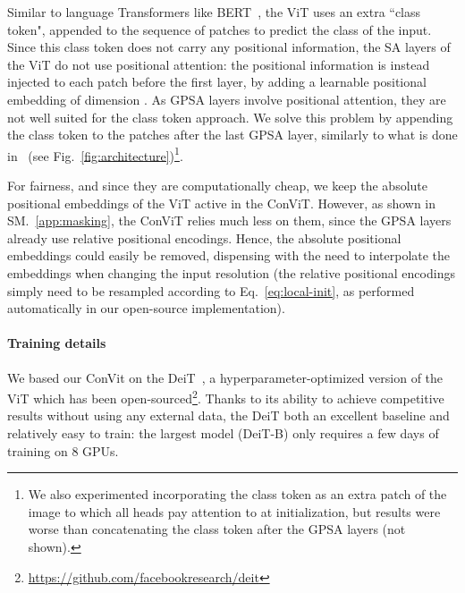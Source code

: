 Similar to language Transformers like BERT~\cite{devlin2018bert}, the ViT uses an extra ``class token", appended to the sequence of patches to predict the class of the input. Since this class token does not carry any positional information, the SA layers of the ViT do not use positional attention: the positional information is instead injected to each patch before the first layer, by adding a learnable positional embedding of dimension . As GPSA layers involve positional attention, they are not well suited for the class token approach. We solve this problem by appending the class token to the patches after the last GPSA layer, similarly to what is done in~\cite{touvron2021going} (see Fig.~\ref{fig:architecture})\footnote{We also experimented incorporating the class token as an extra patch of the image to which all heads pay attention to at initialization, but results were worse than concatenating the class token after the GPSA layers (not shown).}. 

For fairness, and since they are computationally cheap, we keep the absolute positional embeddings of the ViT active in the ConViT. However, as shown in SM.~\ref{app:masking}, the ConViT relies much less on them, since the GPSA layers already use relative positional encodings. Hence, the absolute positional embeddings could easily be removed, dispensing with the need to interpolate the embeddings when changing the input resolution (the relative positional encodings simply need to be resampled according to Eq.~\ref{eq:local-init}, as performed automatically in our open-source implementation).

\paragraph{Training details}

We based our ConVit on the DeiT~\cite{touvron2020training}, a hyperparameter-optimized version of the ViT which has been open-sourced\footnote{ \url{https://github.com/facebookresearch/deit}}. Thanks to its ability to achieve competitive results without using any external data, the DeiT both an excellent baseline and relatively easy to train: the largest model (DeiT-B) only requires a few days of training on 8 GPUs. 

